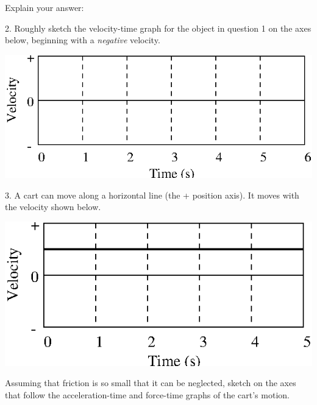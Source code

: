 Explain your answer:
\vspace{10mm}

2. Roughly sketch the velocity-time graph for the object in question 1 on the
axes below, beginning with a \textit{negative} velocity.

\vspace{0.3cm}
{\par\centering \includegraphics{force1/force1_fig7.eps} \par}
\vspace{0.3cm}

3. A cart can move along a horizontal line (the + position axis). It moves with
the velocity shown below.

\vspace{0.3cm}
{\par\centering \includegraphics{force1/force1_fig8.eps} \par}
\vspace{0.3cm}

\pagebreak[2]
Assuming that friction is so small that it can be neglected, sketch on the axes
that follow the acceleration-time and force-time graphs of the cart's motion.

